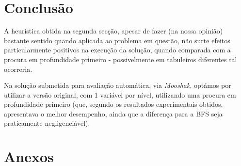 \documentclass[12pt,a4paper]{article}
\begin{document}
\section*{Conclusão}

A heurística obtida na segunda secção, apesar de fazer (na nossa opinião) bastante
sentido quando aplicada ao problema em questão, não surte efeitos particularmente
positivos na execução da solução, quando comparada com a procura em profundidade
primeiro - possivelmente em tabuleiros diferentes tal ocorreria.

Na solução submetida para avaliação automática, via \textit{Mooshak}, optámos
por utilizar a versão original, com 1 variável por nível, utilizando uma
procura em profundidade primeiro (que, segundo os resultados experimentais obtidos,
apresentava o melhor desempenho, ainda que a diferença para a BFS seja
praticamente negligenciável).


\section*{Anexos}

\end{document}
